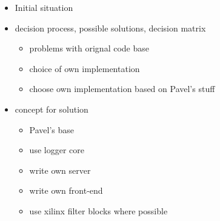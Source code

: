 
\begin{itemize}
    \item
        Initial situation
    \item
        decision process, possible solutions, decision matrix
        \begin{itemize}
            \item
                problems with orignal code base
            \item
                choice of own implementation
            \item
                choose own implementation based on Pavel's stuff
        \end{itemize}
    \item
        concept for solution
        \begin{itemize}
            \item
                Pavel's base
            \item
                use logger core
            \item
                write own server
            \item
                write own front-end
            \item
                use xilinx filter blocks where possible
        \end{itemize}
\end{itemize}


